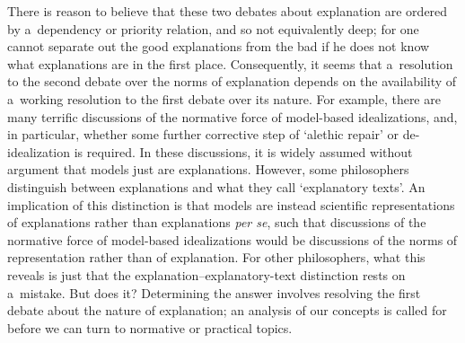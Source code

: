 There is reason to believe that these two debates about explanation are ordered by a~dependency or priority relation, and so not equivalently deep; for one cannot separate out the good explanations from the bad if he does not know what explanations are in the first place. Consequently, it seems that a~resolution to the second debate over the norms of explanation depends on the availability of a~working resolution to the first debate over its nature. For example, there are many terrific discussions of the normative force of model-based idealizations, and, in particular, whether some further corrective step of ‘alethic repair' or de-idealization is required. In these discussions, it is widely assumed without argument that models just are explanations. However, some philosophers distinguish between explanations and what they call ‘explanatory texts'. An implication of this distinction is that models are instead scientific representations of explanations rather than explanations \textit{per se}, such that discussions of the normative force of model-based idealizations would be discussions of the norms of representation rather than of explanation. For other philosophers, what this reveals is just that the explanation–explanatory-text distinction rests on a~mistake. But does it? Determining the answer involves resolving the first debate about the nature of explanation; an analysis of our concepts is called for before we can turn to normative or practical topics.


